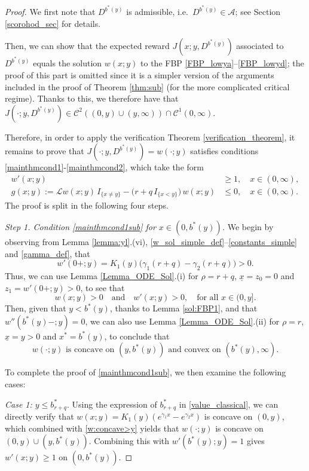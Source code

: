 \documentclass[11pt]{article} %
\newcommand{\ubar}[1]{\underaccent{\bar}{#1}}
\numberwithin{komcounter}{section}
\renewcommand{\ubar}{\underline}
\renewcommand{\bar}{\overline}
\numberwithin{equation}{section}
\numberwithin{theorem}{section}
\begin{document}
\begin{proof}
We first note that $D^{b^*(y)}$ is admissible, i.e.~$D^{b^*(y)}\in \mathcal{A}$; see Section \ref{scorohod_sec} for details. 

Then, we can show that the expected reward $J(x;y,D^{b^*(y)})$ associated to $D^{b^*(y)}$ equals the solution $w(x;y)$ to the FBP \eqref{FBP_lowya}--\eqref{FBP_lowyd}; the proof of this part is omitted since it is a simpler version of the arguments included in the proof of Theorem \ref{thm:sub} (for the more complicated critical regime).
Thanks to this, we therefore have that $J(\cdot;y,D^{b^*(y)}) \in \mathcal{C}^2((0,y) \cup (y,\infty)) \cap \mathcal{C}^1(0,\infty)$.

Therefore, in order to apply the verification Theorem \ref{verification_theorem}, it remains to prove that $J(\cdot;y,D^{b^*(y)}) = w(\cdot;y)$ satisfies conditions \eqref{mainthmcond1}-\eqref{mainthmcond2}, which take the form
\begin{align}
w'(x;y) &\geq 1, \quad x\in (0,\infty), \label{mainthmcond1sub}  \tag{I'} \\
g(x;y) := \mathcal{L} w(x;y) \, I_{\{x\not=y\}} -\big(r + q \, I_{\{x<y\}} \big) \, w(x;y) &\leq 0, \quad x\in (0,\infty). \label{mainthmcond2sub}  \tag{II'} 
\end{align}
The proof is split in the following four steps.

\vspace{1mm}
{\it Step 1. Condition \eqref{mainthmcond1sub} for $x\in (0,b^*(y))$.} 
We begin by observing from Lemma \ref{lemma:yl}.(vi), \eqref{w_sol_simple_def}--\eqref{constants_simple} and \eqref{gamma_def}, that 
$$
w'(0+;y) = K_1(y) \big( \gamma_1(r+q) - \gamma_2(r+q) \big) > 0.
$$
Thus, we can use Lemma \ref{Lemma_ODE_Sol}.(i) for $\rho=r+q$, $\ubar{x}=z_0=0$ and $z_1 = w'(0+;y)>0$, to see that 
$$
w(x;y) > 0 \quad \text{and} \quad w'(x;y) > 0 , \quad \text{for all } x \in (0,y].
$$ 
Then, given that $y < b^*(y)$, thanks to Lemma \ref{sol:FBP1}, and that $w''(b^*(y)-;y)=0$, we can also use Lemma \ref{Lemma_ODE_Sol}.(ii) for $\rho=r$, $\ubar{x}=y>0$ and $x^*=b^*(y)$, to conclude that 
\begin{equation} \label{w:concave>y}
w(\cdot;y) \text{ is concave on $(y,b^*(y))$ and convex on $(b^*(y),\infty)$}.
\end{equation}

To complete the proof of \eqref{mainthmcond1sub}, we then examine the following cases: 

{\it Case 1: $y \leq b^*_{r+q}$}.
Using the expression of $b^*_{r+q}$ in \eqref{value_classical}, we can directly verify that $w(x;y)=K_1(y)(e^{\gamma_1 x}-e^{\gamma_2 x})$ is concave on $(0,y)$, which combined with \eqref{w:concave>y} yields that $w(\cdot;y)$ is concave on $(0,y)\cup (y,b^*(y))$. Combining this with $w'(b^*(y);y)=1$ gives $w'(x;y) \geq 1$ on $(0,b^*(y))$.


\end{proof}
\end{document}
